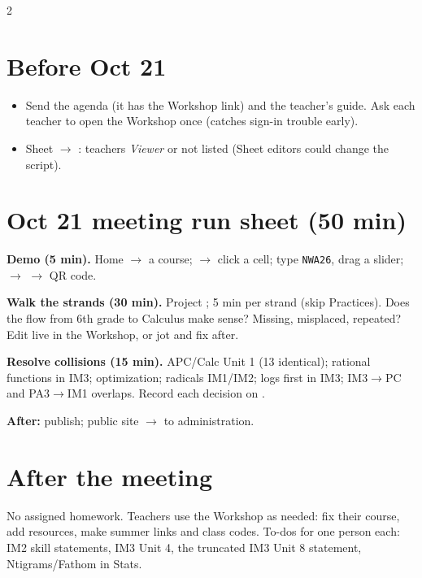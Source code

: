 \documentclass[10pt]{article}
\begin{document}
\begin{multicols}{2}
\section*{Before Oct 21}
\begin{itemize}
\item Send the agenda (it has the Workshop link) and the teacher's guide. Ask each teacher to open the Workshop once
  (catches sign-in trouble early).
\item Sheet $\to$ : teachers \emph{Viewer} or not listed (Sheet editors could change the script).
\end{itemize}

\section*{Oct 21 meeting run sheet (50 min)}
\begin{description}[style=sameline,leftmargin=3.3em,font=\color{teal}\bfseries]
\item[0:00] \textbf{Demo (5 min).} Home $\to$ a course;  $\to$ click a cell;
  type \texttt{NWA26}, drag a slider;  $\to$  $\to$ QR code.
\item[0:05] \textbf{Walk the strands (30 min).} Project ; 5 min per strand
  (skip Practices). Does the flow from 6th grade to Calculus make sense? Missing, misplaced, repeated?
  Edit live in the Workshop, or jot and fix after.
\item[0:35] \textbf{Resolve collisions (15 min).} APC/Calc Unit 1 (13 identical); rational functions in
  IM3; optimization; radicals IM1/IM2; logs first in IM3; IM3$\to$PC and PA3$\to$IM1 overlaps.
  Record each decision on .
\item[0:50] \textbf{After:} publish; public site $\to$  to administration.
\end{description}

\section*{After the meeting}
No assigned homework. Teachers use the Workshop as needed: fix their course, add resources, make summer
links and class codes. To-dos for one person each: IM2 skill statements, IM3 Unit 4, the truncated IM3
Unit 8 statement, Ntigrams/Fathom in Stats.

\columnbreak

\end{multicols}
\end{document}

